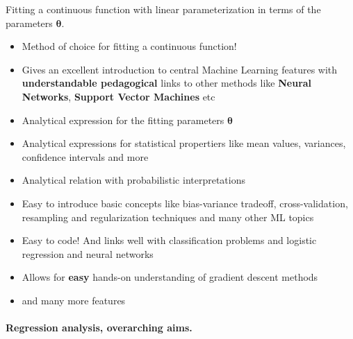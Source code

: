 \documentclass[%
oneside,                 %
final,                   %
10pt]{article}
\begin{document}
Fitting a continuous function with linear parameterization in terms of the parameters  $\bm{\theta}$.
\begin{itemize}
\item Method of choice for fitting a continuous function!

\item Gives an excellent introduction to central Machine Learning features with \textbf{understandable pedagogical} links to other methods like \textbf{Neural Networks}, \textbf{Support Vector Machines} etc

\item Analytical expression for the fitting parameters $\bm{\theta}$

\item Analytical expressions for statistical propertiers like mean values, variances, confidence intervals and more

\item Analytical relation with probabilistic interpretations 

\item Easy to introduce basic concepts like bias-variance tradeoff, cross-validation, resampling and regularization techniques and many other ML topics

\item Easy to code! And links well with classification problems and logistic regression and neural networks

\item Allows for \textbf{easy} hands-on understanding of gradient descent methods

\item and many more features
\end{itemize}

\noindent
\paragraph{Regression analysis, overarching aims.}
\end{document}
